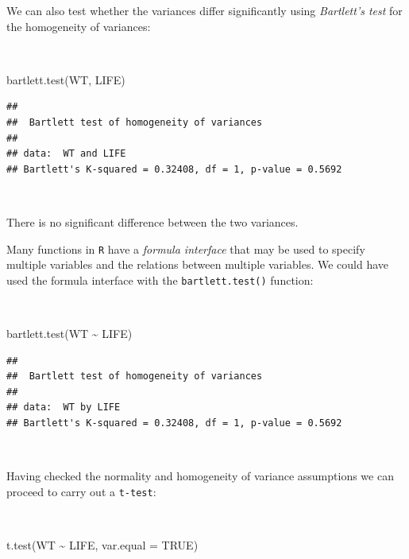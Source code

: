 \documentclass[
  12pt,
]{book}
\newenvironment{Shaded}{\begin{snugshade}}{\end{snugshade}}
\newcommand{\AttributeTok}[1]{\textcolor[rgb]{0.77,0.63,0.00}{#1}}
\newcommand{\ConstantTok}[1]{\textcolor[rgb]{0.00,0.00,0.00}{#1}}
\newcommand{\FunctionTok}[1]{\textcolor[rgb]{0.00,0.00,0.00}{#1}}
\newcommand{\NormalTok}[1]{#1}
\newcommand{\SpecialCharTok}[1]{\textcolor[rgb]{0.00,0.00,0.00}{#1}}
\begin{document}
\newpage

We can also test whether the variances differ significantly using \emph{Bartlett's test} for the homogeneity of variances:

~

\begin{Shaded}
\begin{Highlighting}[]
\FunctionTok{bartlett.test}\NormalTok{(WT, LIFE)}
\end{Highlighting}
\end{Shaded}

\begin{verbatim}
## 
##  Bartlett test of homogeneity of variances
## 
## data:  WT and LIFE
## Bartlett's K-squared = 0.32408, df = 1, p-value = 0.5692
\end{verbatim}

~

There is no significant difference between the two variances.

Many functions in \texttt{R} have a \emph{formula interface} that may be used to specify multiple variables and the relations between multiple variables. We could have used the formula interface with the \texttt{bartlett.test()} function:

~

\begin{Shaded}
\begin{Highlighting}[]
\FunctionTok{bartlett.test}\NormalTok{(WT }\SpecialCharTok{\textasciitilde{}}\NormalTok{ LIFE)}
\end{Highlighting}
\end{Shaded}

\begin{verbatim}
## 
##  Bartlett test of homogeneity of variances
## 
## data:  WT by LIFE
## Bartlett's K-squared = 0.32408, df = 1, p-value = 0.5692
\end{verbatim}

~

Having checked the normality and homogeneity of variance assumptions we can proceed to carry out a \texttt{t-test}:

~

\begin{Shaded}
\begin{Highlighting}[]
\FunctionTok{t.test}\NormalTok{(WT }\SpecialCharTok{\textasciitilde{}}\NormalTok{ LIFE, }\AttributeTok{var.equal =} \ConstantTok{TRUE}\NormalTok{)}
\end{Highlighting}
\end{Shaded}
\end{document}

